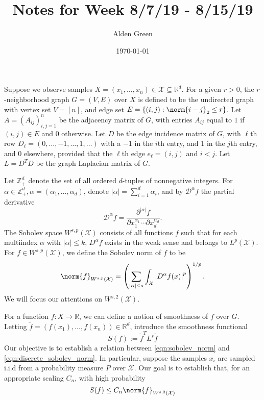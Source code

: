\documentclass{article}
\newcommand{\Reals}{\mathbb{R}}
\newcommand{\abs}[1]{\left \lvert #1 \right \rvert}
\newcommand{\set}[1]{\left\{#1\right\}}
\newcommand{\1}{\mathbf{1}}
\newcommand{\Rd}{\Reals^d}
\newcommand{\domain}{\mathcal{X}}
\newcommand{\Partial}{\mathcal{D}}
\newcommand{\wt}[1]{\widetilde{#1}}
\theoremstyle{alden}
\theoremstyle{aldenthm}
\theoremstyle{definition}
\theoremstyle{remark}
\begin{document}
\title{Notes for Week 8/7/19 - 8/15/19}
\author{Alden Green}
\date{\today}
\maketitle

Suppose we observe samples $X = (x_1, \ldots, x_n) \in \mathcal{X} \subseteq \Rd$. For a given $r > 0$, the $r$-neighborhood graph $G = (V,E)$ over $X$ is defined to be the undirected graph with vertex set $V = [n]$, and edge set $E = \set{(i,j): \norm{i - j}_2 \leq r}$. Let $A = (A_{ij})_{i,j = 1}^{n}$ be the adjacency matrix of $G$, with entries $A_{ij}$ equal to $1$ if $(i,j) \in E$ and $0$ otherwise. Let $D$ be the edge incidence matrix of $G$, with $\ell$th row $D_{\ell} = (0,\ldots,-1,\ldots,1,\ldots)$ with a $-1$ in the $i$th entry, and $1$ in the $j$th entry, and $0$ elsewhere, provided that the $\ell$th edge $e_{\ell} = (i,j)$ and $i < j$. Let $L = D^T D$ be the graph Laplacian matrix of $G$.

Let $\mathbb{Z}_{+}^d$ denote the set of all ordered $d$-tuples of nonnegative integers. For $\alpha \in \mathbb{Z}_{+}^d, \alpha = (\alpha_1,\ldots,\alpha_d)$, denote $\abs{\alpha} = \sum_{i = 1}^{d} \alpha_i$, and by $\mathcal{D}^{\alpha}f$ the partial derivative
\begin{equation*}
\Partial^{\alpha}f = \frac{\partial^{\abs{\alpha}}f}{\partial x_1^{\alpha_1}\cdots\partial x_d^{\alpha_d}}.
\end{equation*}
The Sobolev space $W^{s,p}(\mathcal{X})$ consists of all functions $f$ such that for each multiindex $\alpha$ with $\abs{\alpha} \leq k$, $D^{\alpha}f$ exists in the weak sense and belongs to $L^p(\mathcal{X})$. For $f \in W^{s,p}(\mathcal{X})$, we define the Sobolev norm of $f$ to be
\begin{equation}
\label{eqn:sobolev_norm}
\norm{f}_{W^{s,p}(\mathcal{X})} = \left(\sum_{\abs{\alpha} \leq s} \int_{\domain} \abs{D^{\alpha}f(x)}^p\right)^{1/p}.
\end{equation}
We will focus our attentions on $W^{s,2}(\domain)$.

For a function $f: X \to \Reals$, we can define a notion of smoothness of $f$ over $G$. Letting $\widetilde{f} = (f(x_1),\ldots,f(x_n)) \in \Rd$, introduce the smoothness functional
\begin{equation}
\label{eqn:discrete_sobolev_norm}
S(f) := \wt{f}^T L^{s} \wt{f}
\end{equation}
Our objective is to establish a relation between \eqref{eqn:sobolev_norm} and \eqref{eqn:discrete_sobolev_norm}. In particular, suppose the samples $x_i$ are sampled i.i.d from a probability measure $P$ over $\domain$. Our goal is to establish that, for an appropriate scaling $C_n$, with high probability
\begin{equation}
\label{eqn:continuous_to_discrete_embedding}
S(f) \leq C_n \norm{f}_{W^{s,2}(\mathcal{X})}
\end{equation}
\end{document}
